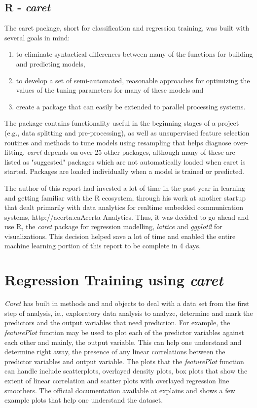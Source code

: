 \documentclass[letterpaper,12pt,titlepage,oneside,final]{report}
\newcommand{\href}[1]{#1} %
\begin{document}
        \subsection {R - \textit{caret}}
            The caret package, short for classification and regression training, was built with several goals in mind:
            \begin{enumerate}
                \item{to eliminate syntactical differences between many of the functions for building and predicting models,}
                \item{to develop a set of semi-automated, reasonable approaches for optimizing the values of the tuning parameters for many of these models and}
                \item{create a package that can easily be extended to parallel processing systems.}
            \end{enumerate}
            The package contains functionality useful in the beginning stages of a project (e.g., data splitting and pre-processing), as well as unsupervised feature selection routines and methods to tune models using resampling that helps diagnose over-fitting. \textit{caret} depends on over 25 other packages, although many of these are listed as "suggested" packages which are not automatically loaded when caret is started. Packages are loaded individually when a model is trained or predicted.

        The author of this report had invested a lot of time in the past year in learning and getting familiar with the R ecosystem, through his work at another startup that dealt primarily with data analytics for realtime embedded communication systems, \href{http://acerta.ca}{Acerta Analytics}. Thus, it was decided to go ahead and use R, the \textit{caret \cite{caretR}} package for regression modelling, \textit{lattice \cite{latticebook}} and \textit{ggplot2 \cite{ggplot2}} for visualizations. This decision helped save a lot of time and enabled the entire machine learning portion of this report to be complete in 4 days.

    \section {Regression Training using \textit{caret}}
        \textit{Caret} has built in methods and and objects to deal with a data set from the first step of analysis, ie., exploratory data analysis to analyze, determine and mark the predictors and the output variables that need prediction. For example, the \textit{featurePlot} function may be used to plot each of the predictor variables against each other and mainly, the output variable. This can help one understand and determine right away, the presence of any linear correlations between the predictor variables and output variable. The plots that the \textit{featurePlot} function can handle include scatterplots, overlayed density plots,  box plots that show the extent of linear correlation and scatter plots with overlayed regression line smoothers. The official documentation available at \cite{Visua58:online} explains and shows a few example plots that help one understand the dataset. 
\end{document}
